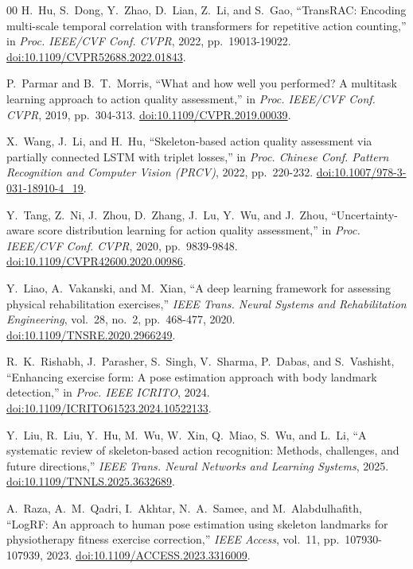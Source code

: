 \documentclass[conference]{IEEEtran}
\begin{document}
\begin{thebibliography}{00}
H.~Hu, S.~Dong, Y.~Zhao, D.~Lian, Z.~Li, and S.~Gao, ``TransRAC: Encoding multi-scale temporal correlation with transformers for repetitive action counting,'' in \textit{Proc. IEEE/CVF Conf. CVPR}, 2022, pp.~19013-19022. \href{https://doi.org/10.1109/CVPR52688.2022.01843}{doi:10.1109/CVPR52688.2022.01843}.

P.~Parmar and B.~T.~Morris, ``What and how well you performed? A multitask learning approach to action quality assessment,'' in \textit{Proc. IEEE/CVF Conf. CVPR}, 2019, pp.~304-313. \href{https://doi.org/10.1109/CVPR.2019.00039}{doi:10.1109/CVPR.2019.00039}.

X.~Wang, J.~Li, and H.~Hu, ``Skeleton-based action quality assessment via partially connected LSTM with triplet losses,'' in \textit{Proc. Chinese Conf. Pattern Recognition and Computer Vision (PRCV)}, 2022, pp.~220-232. \href{https://doi.org/10.1007/978-3-031-18910-4_19}{doi:10.1007/978-3-031-18910-4\_19}.

Y.~Tang, Z.~Ni, J.~Zhou, D.~Zhang, J.~Lu, Y.~Wu, and J.~Zhou, ``Uncertainty-aware score distribution learning for action quality assessment,'' in \textit{Proc. IEEE/CVF Conf. CVPR}, 2020, pp.~9839-9848. \href{https://doi.org/10.1109/CVPR42600.2020.00986}{doi:10.1109/CVPR42600.2020.00986}.

Y.~Liao, A.~Vakanski, and M.~Xian, ``A deep learning framework for assessing physical rehabilitation exercises,'' \textit{IEEE Trans. Neural Systems and Rehabilitation Engineering}, vol.~28, no.~2, pp.~468-477, 2020. \href{https://doi.org/10.1109/TNSRE.2020.2966249}{doi:10.1109/TNSRE.2020.2966249}.

R.~K.~Rishabh, J.~Parasher, S.~Singh, V.~Sharma, P.~Dabas, and S.~Vashisht, ``Enhancing exercise form: A pose estimation approach with body landmark detection,'' in \textit{Proc. IEEE ICRITO}, 2024. \href{https://doi.org/10.1109/ICRITO61523.2024.10522133}{doi:10.1109/ICRITO61523.2024.10522133}.

Y.~Liu, R.~Liu, Y.~Hu, M.~Wu, W.~Xin, Q.~Miao, S.~Wu, and L.~Li, ``A systematic review of skeleton-based action recognition: Methods, challenges, and future directions,'' \textit{IEEE Trans. Neural Networks and Learning Systems}, 2025. \href{https://doi.org/10.1109/TNNLS.2025.3632689}{doi:10.1109/TNNLS.2025.3632689}.

A.~Raza, A.~M.~Qadri, I.~Akhtar, N.~A.~Samee, and M.~Alabdulhafith, ``LogRF: An approach to human pose estimation using skeleton landmarks for physiotherapy fitness exercise correction,'' \textit{IEEE Access}, vol.~11, pp.~107930-107939, 2023. \href{https://doi.org/10.1109/ACCESS.2023.3316009}{doi:10.1109/ACCESS.2023.3316009}.


\end{thebibliography}
\end{document}
